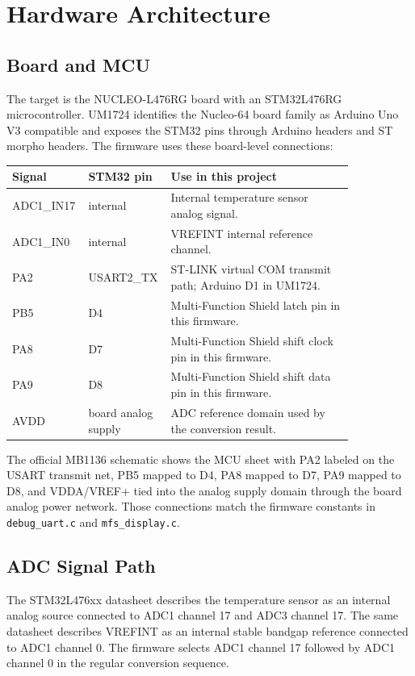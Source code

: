 \documentclass[11pt,a4paper]{article}
\begin{document}
\section{Hardware Architecture}

\subsection{Board and MCU}

The target is the NUCLEO-L476RG board with an STM32L476RG microcontroller. UM1724
identifies the Nucleo-64 board family as Arduino Uno V3 compatible and exposes
the STM32 pins through Arduino headers and ST morpho headers. The firmware uses
these board-level connections:

\begin{longtable}{>{\ttfamily}p{0.16\linewidth}>{\ttfamily}p{0.16\linewidth}p{0.52\linewidth}}
\toprule
Signal & STM32 pin & Use in this project \\
\midrule
\endhead
ADC1\_IN17 & internal & Internal temperature sensor analog signal. \\
ADC1\_IN0 & internal & VREFINT internal reference channel. \\
PA2 & USART2\_TX & ST-LINK virtual COM transmit path; Arduino D1 in UM1724. \\
PB5 & D4 & Multi-Function Shield latch pin in this firmware. \\
PA8 & D7 & Multi-Function Shield shift clock pin in this firmware. \\
PA9 & D8 & Multi-Function Shield shift data pin in this firmware. \\
AVDD & board analog supply & ADC reference domain used by the conversion result. \\
\bottomrule
\end{longtable}

The official MB1136 schematic shows the MCU sheet with PA2 labeled on the
USART transmit net, PB5 mapped to D4, PA8 mapped to D7, PA9 mapped to D8, and
VDDA/VREF+ tied into the analog supply domain through the board analog power
network. Those connections match the firmware constants in \texttt{debug\_uart.c}
and \texttt{mfs\_display.c}.

\subsection{ADC Signal Path}

The STM32L476xx datasheet describes the temperature sensor as an internal analog
source connected to ADC1 channel 17 and ADC3 channel 17. The same datasheet
describes VREFINT as an internal stable bandgap reference connected to ADC1
channel 0. The firmware selects ADC1 channel 17 followed by ADC1 channel 0 in
the regular conversion sequence.
\end{document}
